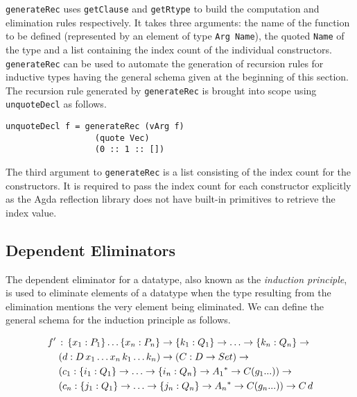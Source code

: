 \documentclass[sigplan,10pt]{acmart}
\begin{document}
\normalsize

{\tt generateRec} uses {\tt getClause} and {\tt getRtype} to build the computation and elimination rules respectively. It takes three arguments: the name of the function to be defined (represented by an element of type {\tt Arg Name}), the quoted {\tt Name} of the type and a list containing the index count of the individual constructors. {\tt generateRec} can be used to automate the generation of recursion rules for inductive types having the general schema given at the beginning of this section. The recursion rule generated by {\tt generateRec} is brought into scope using {\tt unquoteDecl} as follows.

\begin{center}
\begingroup
\begin{BVerbatim}
unquoteDecl f = generateRec (vArg f)
                  (quote Vec) 
                  (0 :: 1 :: [])
\end{BVerbatim}
\endgroup
\end{center}

\normalsize

The third argument to {\tt generateRec} is a list consisting of the index count for the constructors. It is required to pass the index count for each constructor explicitly as the Agda reflection library does not have built-in primitives to retrieve the index value.

\subsection{Dependent Eliminators}
\label{sec:sec3.2}

The dependent eliminator for a datatype, also known as the \emph{induction principle}, is used to eliminate elements of a datatype when the type resulting from the elimination mentions the very element being eliminated. We can define the general schema for the induction principle as follows.
\begin{center}
\begingroup
\fontsize{7.9pt}{2pt}\selectfont
\begin{align}
& f' \, : \, \{x_1:P_1\}\ldots\{x_n:P_n\} \rightarrow \{k_1:Q_1\} \rightarrow\ldots\rightarrow \{k_n:Q_n\} \rightarrow \nonumber \\
& \hspace{0.4cm} (d : D \, x_1 \dots x_n \, k_1 \ldots k_n) \rightarrow (C : D \rightarrow Set) \rightarrow \nonumber \\
& \hspace{0.4cm} (c_1 : \{i_1:Q_1\} \rightarrow\ldots\rightarrow \{i_n:Q_n\} \rightarrow A{_1}^* \rightarrow C (g_1 ...)) \rightarrow \nonumber \\
& \hspace{0.4cm} (c_n : \{j_1:Q_1\} \rightarrow\ldots\rightarrow \{j_n:Q_n\} \rightarrow A{_n}^* \rightarrow C (g_n ...)) \rightarrow C \, d \nonumber \\ \nonumber 
\end{align}
\endgroup
\end{center}
\normalsize
\end{document}
